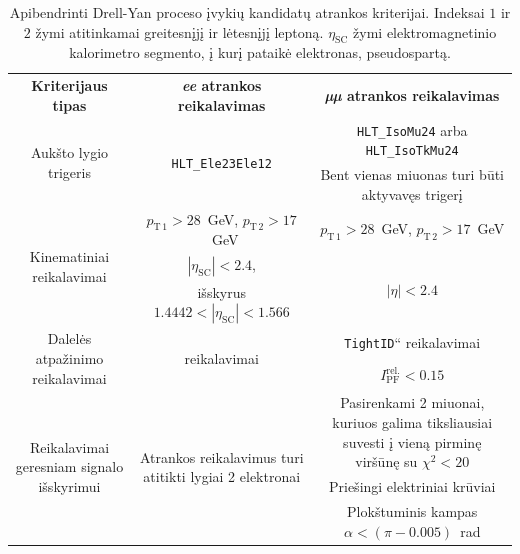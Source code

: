 \documentclass[a4paper, 12pt, oneside]{article}
\newcommand{\ttt}[1]{\texttt{#1}}
\newcommand{\ltq}[1]{{\quotedblbase{}#1\textquotedblleft{}}}
\newlength\q
\begin{document}
\begin{table}[t!]
	\begin{tabular}{|c|c|c|}
		\hline
		\multirow{2}{9em}{\centering\textbf{Kriterijaus tipas}} & \multirow{2}{13em}{\centering\textbf{\textit{ee} atrankos reikalavimas}} &
			\multirow{2}{12em}{\centering\textbf{\textit{µµ} atrankos reikalavimas}}\\
		 & & \\
		\hline\hline
		\multirow{4}{9em}{\centering Aukšto lygio trigeris} & \multirow{4}{12em}{\centering\ttt{HLT\_Ele23Ele12}} &
			\multirow{2}{13em}{\centering\ttt{HLT\_IsoMu24} arba \ttt{HLT\_IsoTkMu24}} \\
		 & & \\ \cline{3-3}
		 & & \multirow{2}{12em}{\centering Bent vienas miuonas turi būti aktyvavęs trigerį} \\
		 & & \\
		\hline\hline
		\multirow{4}{9em}{\centering Kinematiniai reikalavimai} &
			\multirow{2}{13em}{\centering $p_{\mathrm{T \, 1}} > 28$~GeV, $p_{\mathrm{T \, 2}} > 17$~GeV} &
			\multirow{2}{12em}{\centering $p_{\mathrm{T \, 1}} > 28$~GeV, $p_{\mathrm{T \, 2}} > 17$~GeV} \\
		 & & \\ \cline{2-3}
		 & $|\eta_{\mathrm{SC}}| < 2.4$, & \multirow{2}{12em}{\centering $|\eta| < 2.4$} \\
		 & išskyrus $1.4442<|\eta_{\mathrm{SC}}|<1.566$ & \\
		\hline\hline
		\multirow{2}{9em}{\centering Dalelės atpažinimo reikalavimai} & \multirow{2}{13em}{\centering \ltq{\ttt{MediumID}} reikalavimai} &
			\ltq{\ttt{TightID}} reikalavimai \\ \cline{3-3}
		 & & $I_{\mathrm{PF}}^{\mathrm{rel.}}<0.15$ \\
		\hline\hline
		\multirow{7}{9em}{\centering Reikalavimai geresniam signalo išskyrimui} &
			\multirow{7}{13em}{\centering Atrankos reikalavimus turi atitikti lygiai 2 elektronai} &
			\multirow{4}{12em}{\centering Pasirenkami 2 miuonai, kuriuos galima tiksliausiai suvesti į vieną pirminę viršūnę su $\chi^2<20$} \\
		 & & \\
		 & & \\
		 & & \\ \cline{3-3}
		 & & Priešingi elektriniai krūviai \\ \cline{3-3}
		 & & \multirow{2}{12em}{\centering Plokštuminis kampas $\alpha < (\pi - 0.005)$~rad} \\
		 & & \\
		\hline
	\end{tabular}
	\caption{\label{table:selection}Apibendrinti Drell-Yan proceso įvykių kandidatų atrankos kriterijai.
	Indeksai $1$ ir $2$ žymi atitinkamai greitesnįjį ir lėtesnįjį leptoną.
	$\eta_{\mathrm{SC}}$ žymi elektromagnetinio kalorimetro segmento, į kurį pataikė elektronas, pseudospartą.}
\end{table}
\end{document}
